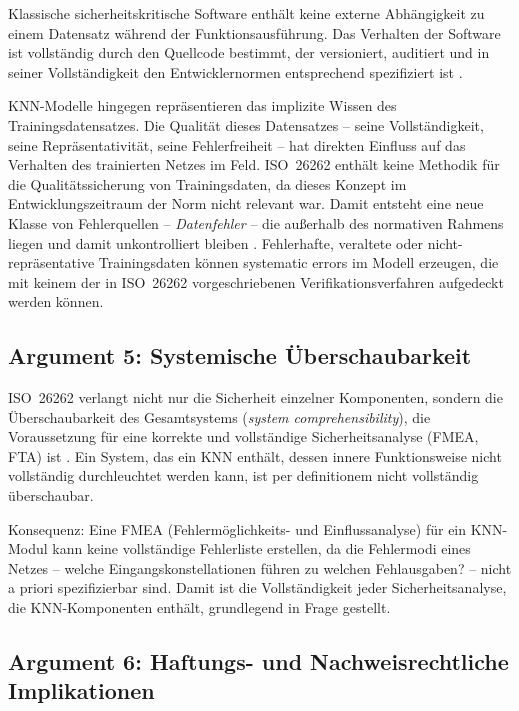 ﻿\documentclass[12pt,a4paper]{article}
\begin{document}
Klassische sicherheitskritische Software enth\"alt keine externe Abh\"angigkeit
zu einem Datensatz w\"ahrend der Funktionsausf\"uhrung. Das Verhalten der
Software ist vollst\"andig durch den Quellcode bestimmt, der versioniert, auditiert
und in seiner Vollst\"andigkeit den Entwicklernormen entsprechend spezifiziert
ist \cite{Sommerville2016}.

KNN-Modelle hingegen repr\"asentieren das implizite Wissen des Trainingsdatensatzes.
Die Qualit\"at dieses Datensatzes -- seine Vollst\"andigkeit, seine Repr\"asentativit\"at,
seine Fehlerfreiheit -- hat direkten Einfluss auf das Verhalten des trainierten Netzes
im Feld. ISO~26262 enth\"alt keine Methodik f\"ur die Qualit\"atssicherung von
Trainingsdaten, da dieses Konzept im Entwicklungszeitraum der Norm nicht relevant war.
Damit entsteht eine neue Klasse von Fehlerquellen -- \emph{Datenfehler} -- die
au\ss{}erhalb des normativen Rahmens liegen und damit unkontrolliert bleiben
\cite{Gauerhof2018}. Fehlerhafte, veraltete oder nicht-repr\"asentative Trainingsdaten
k\"onnen systematic errors im Modell erzeugen, die mit keinem der in ISO~26262
vorgeschriebenen Verifikationsverfahren aufgedeckt werden k\"onnen.

\subsection{Argument 5: Systemische \"Uberschaubarkeit}
\label{subsec:arg5}

ISO~26262 verlangt nicht nur die Sicherheit einzelner Komponenten, sondern die
\"Uberschaubarkeit des Gesamtsystems (\emph{system comprehensibility}), die
Voraussetzung f\"ur eine korrekte und vollst\"andige Sicherheitsanalyse (FMEA,
FTA) ist \cite{iso26262_9}. Ein System, das ein KNN enth\"alt, dessen
innere Funktionsweise nicht vollst\"andig durchleuchtet werden kann, ist per
definitionem nicht vollst\"andig \"uberschaubar.

Konsequenz: Eine FMEA (Fehlerm\"oglichkeits- und Einflussanalyse) f\"ur ein KNN-Modul
kann keine vollst\"andige Fehlerliste erstellen, da die Fehlermodi eines Netzes --
welche Eingangskonstellationen f\"uhren zu welchen Fehlausgaben? -- nicht a priori
spezifizierbar sind. Damit ist die Vollst\"andigkeit jeder Sicherheitsanalyse,
die KNN-Komponenten enth\"alt, grundlegend in Frage gestellt.

\subsection{Argument 6: Haftungs- und Nachweisrechtliche Implikationen}
\label{subsec:arg6}
\end{document}
